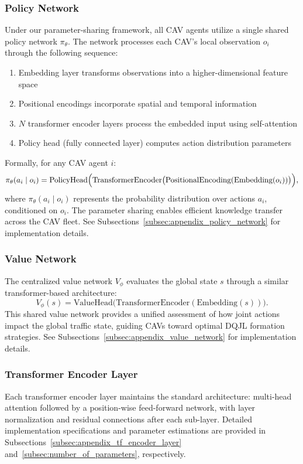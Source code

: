 \subsubsection{Policy Network}
Under our parameter-sharing framework, all CAV agents utilize a single shared policy network \(\pi_{\theta}\). The network processes each CAV's local observation \(o_i\) through the following sequence:
\begin{enumerate}
    \item Embedding layer transforms observations into a higher-dimensional feature space
    \item Positional encodings incorporate spatial and temporal information
    \item \(N\) transformer encoder layers process the embedded input using self-attention
    \item Policy head (fully connected layer) computes action distribution parameters
\end{enumerate}

Formally, for any CAV agent \(i\):
\[
\pi_{\theta}(a_i \mid o_i) = \text{PolicyHead}\Bigl( \text{TransformerEncoder}\bigl( \text{PositionalEncoding}( \text{Embedding}(o_i) ) \bigr) \Bigr),
\]
where \(\pi_{\theta}(a_i \mid o_i)\) represents the probability distribution over actions \(a_i\), conditioned on \(o_i\). The parameter sharing enables efficient knowledge transfer across the CAV fleet. See Subsections~\ref{subsec:appendix_policy_network} for implementation details.

\subsubsection{Value Network}
The centralized value network \(V_{\phi}\) evaluates the global state \(s\) through a similar transformer-based architecture:
\[
V_{\phi}(s) = \text{ValueHead}\bigl( \text{TransformerEncoder}( \text{Embedding}(s) ) \bigr).
\]
This shared value network provides a unified assessment of how joint actions impact the global traffic state, guiding CAVs toward optimal DQJL formation strategies. See Subsections~\ref{subsec:appendix_value_network} for implementation details.

\subsubsection{Transformer Encoder Layer}
Each transformer encoder layer maintains the standard architecture: multi-head attention followed by a position-wise feed-forward network, with layer normalization and residual connections after each sub-layer. Detailed implementation specifications and parameter estimations are provided in Subsections~\ref{subsec:appendix_tf_encoder_layer} and~\ref{subsec:number_of_parameters}, respectively.

